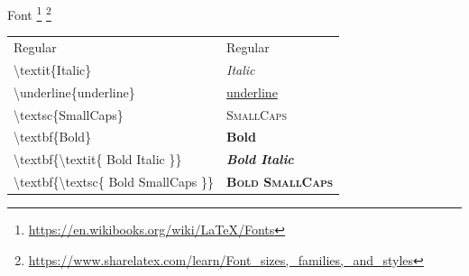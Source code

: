 \documentclass[10pt]{beamer}
\begin{document}
\begin{frame}{Font
\footnote{\url{https://en.wikibooks.org/wiki/LaTeX/Fonts}} 
\footnote{\scriptsize \url{https://www.sharelatex.com/learn/Font_sizes,_families,_and_styles}}}
  \begin{tabular}{ll}
    Regular                                                               &   Regular \\
    \textbackslash textit\{Italic\}                                       &   \textit{Italic} \\
    \textbackslash underline\{underline\}                                   &   \underline{underline}\\
    \textbackslash textsc\{SmallCaps\}                                    &   \textsc{SmallCaps} \\
    \textbackslash textbf\{Bold\}                                         &   \textbf{Bold} \\
    \textbackslash textbf\{\textbackslash textit\{ Bold Italic \}\}       &   \textbf{\textit{Bold Italic}} \\
    \textbackslash textbf\{\textbackslash textsc\{ Bold SmallCaps \}\}    &   \textbf{\textsc{Bold SmallCaps}}
   \end{tabular} 
  
\end{frame}
\end{document}
